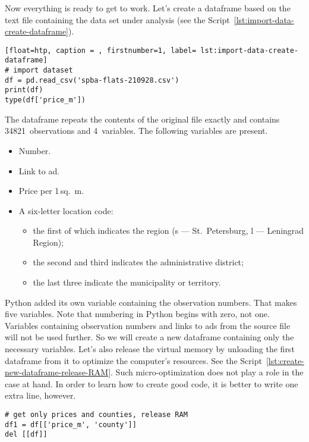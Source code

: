 \documentclass[]{scrreprt}
\begin{document}
Now everything is ready to get to work. Let's create a dataframe based on the text file containing the data set under analysis (see the Script~\ref{lst:import-data-create-dataframe}).
%
\begin{lstlisting}[float=htp, caption = , firstnumber=1, label= lst:import-data-create-dataframe]
# import dataset
df = pd.read_csv('spba-flats-210928.csv')
print(df)
type(df['price_m'])
\end{lstlisting}
%
The dataframe repeats the contents of the original file exactly and contains 34821~observations and 4~variables. The following variables are present.
\begin{itemize}
	\item Number.
	\item Link to ad.
	\item Price per 1\,sq.~m.
	\item A six-letter location code:
	\begin{itemize}
		\item the first of which indicates the region (s --- St.~Petersburg, l --- Leningrad Region);
		\item the second and third indicates the administrative district;
		\item the last three indicate the municipality or territory.		
	\end{itemize}
\end{itemize}
Python added its own variable containing the observation numbers. That makes five variables. Note that numbering in Python begins with zero, not one. Variables containing observation numbers and links to ads from the source file will not be used further. So we will create a new dataframe containing only the necessary variables. Let's also release the virtual memory by unloading the first dataframe from it to optimize the computer's resources. See the Script~\ref{lst:create-new-dataframe-release-RAM}. Such micro-optimization does not play a role in the case at hand. In order to learn how to create good code, it is better to write one extra line, however.
%
\begin{lstlisting}[float=htp, caption = Creating a dataframe containing only necessary variables and freeing memory from objects not used later, firstnumber=1, label= lst:create-new-dataframe-release-RAM]
# get only prices and counties, release RAM
df1 = df[['price_m', 'county']]
del [[df]]
\end{lstlisting}
%
\end{document}
